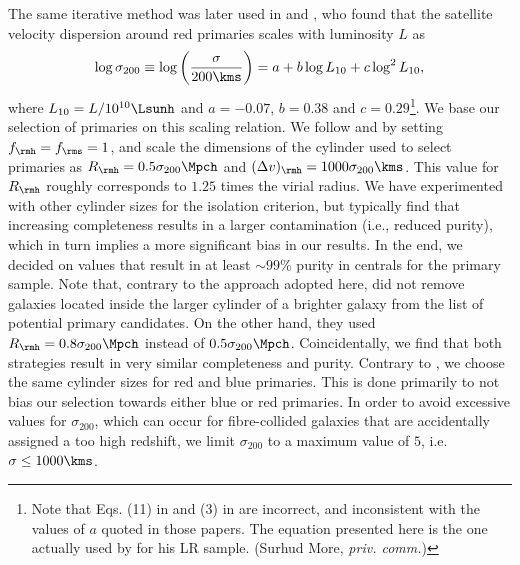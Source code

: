 \documentclass[fleqn,usenatbib,useAMS]{mnras}
\begin{document}
	The same iterative method was later used in \cite{More+09b} and \cite{More+11}, who found that the satellite velocity dispersion around red primaries scales with luminosity $L$ as
	\begin{equation}
	\log \sigma_{200} \equiv \log \left( \frac{\sigma}{200 \kms} \right) = a + b \log L_{10} + c \log^2 L_{10},
	\label{eq:sigma_cylinder}
	\end{equation}
	where $L_{10} = L / 10^{10} \Lsunh$ and $a = -0.07$, $b = 0.38$ and $c = 0.29$\footnote{Note that Eqs. (11) in \cite{More+09b} and (3) in \cite{More+11} are incorrect, and inconsistent with the values of $a$ quoted in those papers. The equation presented here is the one actually used by \cite{More+11} for his LR sample. (Surhud More, {\it priv. comm.})}. We base our selection of primaries on this scaling relation. We follow \citet{vdBosch+04} and \cite{More+11} by setting $f_\rmh = f_\rms = 1$, and scale the dimensions of the cylinder used to select primaries as $R_\rmh = 0.5 \sigma_{200} \Mpch$ and $(\Delta v)_\rmh = 1000 \sigma_{200} \kms$. This value for $R_\rmh$ roughly corresponds to $1.25$ times the virial radius. We have experimented with other cylinder sizes for the isolation criterion, but typically find that increasing completeness results in a larger contamination (i.e., reduced purity), which in turn implies a more significant bias in our results. In the end, we decided on values that result in at least $\sim 99\%$ purity in centrals for the primary sample. Note that, contrary to the approach adopted here, \cite{More+09b, More+11} did not remove galaxies located inside the larger cylinder of a brighter galaxy from the list of potential primary candidates. On the other hand, they used $R_\rmh = 0.8 \sigma_{200} \Mpch$ instead of $0.5 \sigma_{200} \Mpch$. Coincidentally, we find that both strategies result in very similar completeness and purity. Contrary to \cite{More+11}, we choose the same cylinder sizes for red and blue primaries. This is done primarily to not bias our selection towards either blue or red primaries. In order to avoid excessive values for $\sigma_{200}$, which can occur for fibre-collided galaxies that are accidentally assigned a too high redshift, we limit $\sigma_{200}$ to a maximum value of $5$, i.e. $\sigma \leq 1000 \kms$.
	
\end{document}
